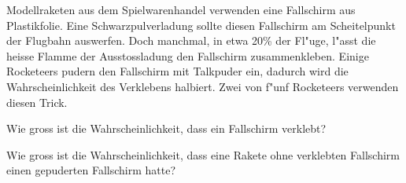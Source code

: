 Modellraketen aus dem Spielwarenhandel verwenden eine Fallschirm aus
Plastikfolie. Eine Schwarzpulverladung sollte diesen Fallschirm am
Scheitelpunkt der Flugbahn auswerfen. Doch manchmal, in etwa 20\%
der Fl"uge, l"asst die heisse
Flamme der Ausstossladung den Fallschirm zusammenkleben. Einige
Rocketeers pudern den Fallschirm mit Talkpuder ein, dadurch wird
die Wahrscheinlichkeit des Verklebens halbiert.
Zwei von f"unf Rocketeers verwenden diesen Trick.
\begin{teilaufgaben}
\item Wie gross ist die Wahrscheinlichkeit, dass ein Fallschirm
verklebt?
\item Wie gross ist die Wahrscheinlichkeit, dass eine Rakete
ohne verklebten Fallschirm einen gepuderten Fallschirm hatte?
\end{teilaufgaben}

